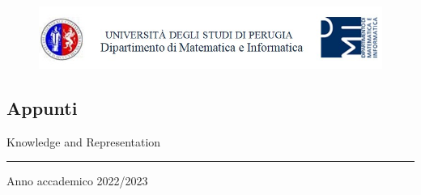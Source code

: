 
\thispagestyle{empty} %
\newcommand\hr{\par\vspace{-.5\ht\strutbox}\noindent\hrulefill\par}

\noindent %
\begin{figure}
    \centering
    \includegraphics[scale=0.8]{img/Fronte.jpg}
\end{figure}
\centering
\vspace{2cm}
\subsection*{Appunti}
\vspace{2cm}
\Large{Knowledge and Representation}
\vspace{2cm}
\vspace{2cm}
\rule{\textwidth}{0.4pt}
\vspace{2cm}
\small{Anno accademico 2022/2023}

